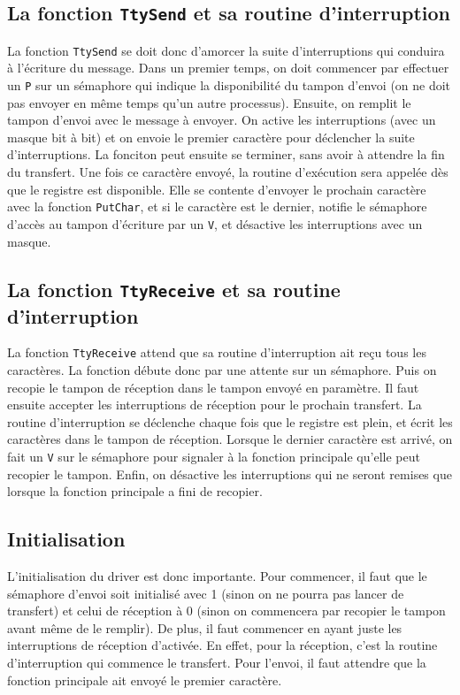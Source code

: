 \documentclass{article}
\def\fun#1{\texttt{#1}}
\begin{document}
\subsection{La fonction \fun{TtySend} et sa routine d'interruption}
La fonction \fun{TtySend} se doit donc d'amorcer la suite d'interruptions qui conduira à l'écriture du message. Dans un premier temps, on doit commencer par effectuer un \fun{P} sur un sémaphore qui indique la disponibilité du tampon d'envoi (on ne doit pas envoyer en même temps qu'un autre processus). Ensuite, on remplit le tampon d'envoi avec le message à envoyer. On active les interruptions (avec un masque bit à bit) et on envoie le premier caractère pour déclencher la suite d'interruptions. La fonciton peut ensuite se terminer, sans avoir à attendre la fin du transfert. Une fois ce caractère envoyé, la routine d'exécution sera appelée dès que le registre est disponible. Elle se contente d'envoyer le prochain caractère avec la fonction \fun{PutChar}, et si le caractère est le dernier, notifie le sémaphore d'accès au tampon d'écriture par un  \fun{V}, et désactive les interruptions avec un masque.

\subsection{La fonction \fun{TtyReceive} et sa routine d'interruption}
La fonction \fun{TtyReceive} attend que sa routine d'interruption ait reçu tous les caractères. La fonction débute donc par une attente sur un sémaphore. Puis on recopie le tampon de réception dans le tampon envoyé en paramètre. Il faut ensuite accepter les interruptions de réception pour le prochain transfert. La routine d'interruption se déclenche chaque fois que le registre est plein, et écrit les caractères dans le tampon de réception. Lorsque le dernier caractère est arrivé, on fait un \fun{V} sur le sémaphore pour signaler à la fonction principale qu'elle peut recopier le tampon. Enfin, on désactive les interruptions qui ne seront remises que lorsque la fonction principale a fini de recopier.

\subsection{Initialisation}
L'initialisation du driver est donc importante. Pour commencer, il faut que le sémaphore d'envoi soit initialisé avec 1 (sinon on ne pourra pas lancer de transfert) et celui de réception à 0 (sinon on commencera par recopier le tampon avant même de le remplir). De plus, il faut commencer en ayant juste les interruptions de réception d'activée. En effet, pour la réception, c'est la routine d'interruption qui commence le transfert. Pour l'envoi, il faut attendre que la fonction principale ait envoyé le premier caractère.
\end{document}
